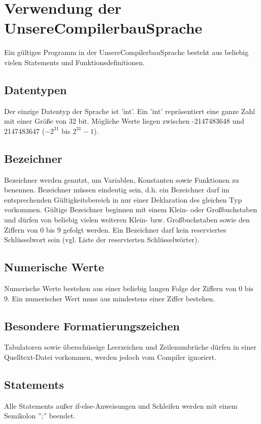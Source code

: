 
\section{Verwendung der UnsereCompilerbauSprache}
Ein gültiges Programm in der UnsereCompilerbauSprache besteht aus beliebig vielen Statements und Funktionsdefinitionen. 

\subsection{Datentypen}
Der einzige Datentyp der Sprache ist 'int'. Ein 'int' repräsentiert eine ganze Zahl mit einer Größe von 32 bit. Mögliche Werte liegen zwischen -2147483648 und 2147483647 ($-2^{31}$ bis $2^{31} - 1$). %

\subsection{Bezeichner}
Bezeichner werden genutzt, um Variablen, Konstanten sowie Funktionen zu benennen.
Bezeichner müssen eindeutig sein, d.h. ein Bezeichner darf im entsprechenden Gültigkeitsbereich in nur einer Deklaration des gleichen Typ vorkommen. Gültige Bezeichner beginnen mit einem Klein- oder Großbuchstaben und dürfen von beliebig vielen weiteren Klein- bzw. Großbuchstaben sowie den Ziffern von 0 bis 9 gefolgt werden. Ein Bezeichner darf kein reserviertes Schlüsselwort sein (vgl. Liste der reservierten Schlüsselwörter).

\subsection{Numerische Werte}
Numerische Werte bestehen aus einer beliebig langen Folge der Ziffern von 0 bis 9. Ein numerischer Wert muss aus mindestens einer Ziffer bestehen.

\subsection{Besondere Formatierungszeichen} 
Tabulatoren sowie überschüssige Leerzeichen und Zeilenumbrüche dürfen in einer Quelltext-Datei vorkommen, werden jedoch vom Compiler ignoriert.

\subsection{Statements}
Alle Statements außer if-else-Anweisungen und Schleifen werden mit einem Semikolon '';'' beendet.

